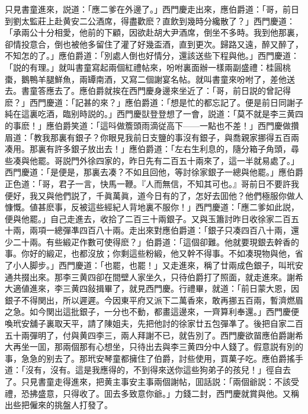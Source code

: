 只見書童進來，説道：「應二爹在外邊了。」西門慶走出來，應伯爵道：「哥，前日到劉太監莊上赴黄安二公酒席，得盡歡麽？直飲到幾時分纔散了？」西門慶道：「承兩公十分相愛，他前的下顧，因欲赴胡大尹酒席，倒坐不多時。我到他那裏，卻情投意合，倒也被他多留住了灌了好幾盃酒，直到更次。歸路又遠，醉又醉了，不知怎的了。」應伯爵道：「別處人倒也好情分，還該送些下程與他。」西門慶道：「説的有理。」就叫書童寫起兩個紅禮帖來，吩咐裏面辦一樣兩副盛禮：桂圓桃棗，鵝鴨羊腿鮮魚，兩罈南酒，又寫二個謝宴名帖。就叫書童來吩咐了，差他送去。書童答應去了。應伯爵就挨在西門慶身邊來坐近了：「哥，前日説的曾記得麽？」西門慶道：「記甚的來？」應伯爵道：「想是忙的都忘記了。便是前日同謝子純在這裏吃酒，臨别時説的。」西門慶獃登登想了一會，説道：「莫不就是李三黄四的事麽！」應伯爵笑道：「這呌做簷頭雨滴従高下——一點也不差！」西門慶做攢眉道：「教我那裏有銀子？你眼見我前日支鹽的事沒有銀子，與喬親家挪得五百兩凑用。那裏有許多銀子放出去！」應伯爵道：「左右生利息的，隨分箱子角頭，尋些凑與他罷。哥説門外徐四家的，昨日先有二百五十兩來了，這一半就易處了。」西門慶道：「是便是，那裏去凑？不如且回他，等討徐家銀子一總與他罷。」應伯爵正色道：「哥，君子一言，快馬一鞭。『人而無信，不知其可也。』哥前日不要許我便好，我又與他們説了，千眞萬眞，道今日有的了，怎好去囬他？他們極服你做人慷慨。値甚麽事，反被這些經紀人背地裏不服你！」西門慶道：「應二爹如此説，便與他罷。」自己走進去，收拾了二百三十兩銀子。又與玉簫討昨日收徐家二百五十兩，兩項一總彈凖四百八十兩。走出來對應伯爵道：「銀子只凑四百八十兩，還少二十兩。有些緞疋作數可使得麽？」伯爵道：「這個卻難。他就要現銀去幹香的事。你好的緞疋，也都沒放；你剩這些粉緞，他又幹不得事。不如凑現物與他，省了小人脚步。」西門慶道：「也罷，也罷！」又走進來，稱了廿兩成色銀子，叫玳安通共掇出來。那李三黄四卻在間壁人家坐久，只待伯爵打了照面，就走進來。謝希大適値進來，李三黄四敍揖畢了，就見西門慶。行禮畢，就道：「前日蒙大恩，因銀子不得関出，所以遲遲。今因東平府又派下二萬香來，敢再挪五百兩，暫濟燃眉之急。如今関出這批銀子，一分也不動，都畫這邊來，一齊算利奉還。」西門慶便喚玳安舖子裏取天平，請了陳姐夫，先把他討的徐家廿五包彈凖了。後把自家二百五十兩彈明了，付與黄四李三，兩人拜謝不已，就告別了。西門慶欲㽞應伯爵謝希大再坐一囬，那兩個那有心想坐，只待出去與李三黄四分中人錢了。假意説有別的事，急急的别去了。那玳安琴童都擁住了伯爵，討些使用，買菓子吃。應伯爵搖手道：「沒有，沒有。這是我應得的，不到得來送你這些狗弟子的孩兒！」徑自去了。只見書童走得進來，把黄主事安主事兩個謝帖，囬話説：「兩個爺説：不該受禮，恐拂盛意，只得收了。囬去多致意你爺。」力錢二封，西門慶就賞與他。又稱出些把僱來的挑盤人打發了。

